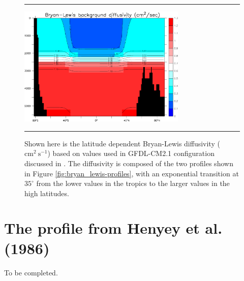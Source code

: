 \begin{figure}[h!t]
\rule{\textwidth}{0.005in}
\begin{center}
\includegraphics[angle=0,width=8cm]{./figs/bl_diffusivity.pdf}
\caption[Latitude-depth Bryan-Lewis diffusivity]{Shown here is the
  latitude dependent Bryan-Lewis diffusivity
  ($\mbox{cm}^{2}~\mbox{s}^{-1}$) based on values used in GFDL-CM2.1
  configuration discussed in \cite{OMDT2005a}.  The diffusivity is
  composed of the two profiles shown in Figure
  \ref{fig:bryan_lewis-profiles}, with an exponential transition at
  $35^{\circ}$ from the lower values in the tropics to the larger
  values in the high latitudes.}
\label{fig:bryan_lewis-lat-depth}
\end{center}
\rule{\textwidth}{0.005in}
\end{figure}


\section{The profile from Henyey et al. (1986)} 
\label{section:henyey-diffusivity}

To be completed.  